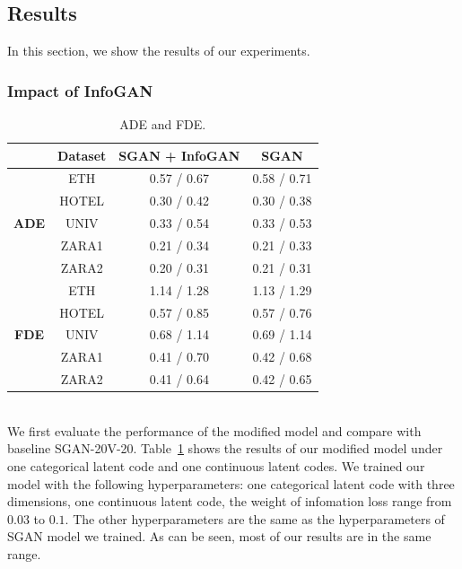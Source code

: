 \subsection{Results}

In this section, we show the results of our experiments.
\subsubsection{Impact of InfoGAN}
\begin{table}[ht]
  \centering
  \caption{ADE and FDE. }
  \begin{tabular}{cccc}
  \toprule
  & Dataset & SGAN + InfoGAN &  SGAN \\
  \midrule
  \multirow{5}{*}{\bf ADE} & ETH & 0.57 / 0.67 & 0.58 / 0.71 \\
                         & HOTEL & 0.30 / 0.42 & 0.30 / 0.38 \\
                         & UNIV & 0.33 / 0.54 & 0.33 / 0.53 \\
                         & ZARA1 & 0.21 / 0.34 & 0.21 / 0.33 \\
                         & ZARA2 & 0.20 / 0.31  & 0.21 / 0.31 \\
  \hline
  \multirow{5}{*}{\bf FDE} & ETH & 1.14 / 1.28 & 1.13 / 1.29 \\
                        & HOTEL & 0.57 / 0.85 & 0.57 / 0.76 \\
                        & UNIV & 0.68 / 1.14 & 0.69 / 1.14 \\
                        & ZARA1 & 0.41 / 0.70 & 0.42 / 0.68 \\
                        & ZARA2 & 0.41 / 0.64  & 0.42 / 0.65 \\

  \bottomrule
  \end{tabular}
  \label{table:adefde}
\end{table}
\hfill \\
We first evaluate the performance of the modified model and compare with baseline SGAN-20V-20. Table~\ref{table:adefde} shows the results of our modified model under one categorical latent code and one continuous latent codes. We trained our model with the following hyperparameters: one categorical latent code with three dimensions, one continuous latent code, the weight of infomation loss range from $0.03$ to $0.1$. The other hyperparameters are the same as the hyperparameters of SGAN model we trained. As can be seen, most of our results are in the same range.

